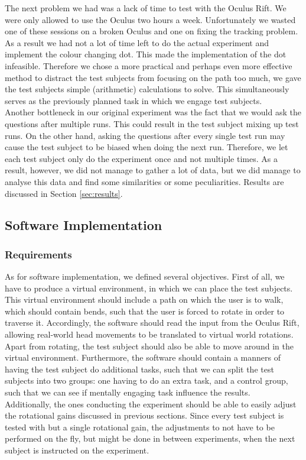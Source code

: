 The next problem we had was a lack of time to test with the Oculus Rift. 
We were only allowed to use the Oculus two hours a week. 
Unfortunately we wasted one of these sessions on a broken Oculus and one on fixing the tracking problem. 
As a result we had not a lot of time left to do the actual experiment and implement the colour changing dot. 
This made the implementation of the dot infeasible. 
Therefore we chose a more practical and perhaps even more effective method to distract the test subjects from focusing on the path too much, we gave the test subjects simple (arithmetic) calculations to solve.
This simultaneously serves as the previously planned task in which we engage test subjects.\\

Another bottleneck in our original experiment was the fact that we would ask the questions after multiple runs.
This could result in the test subject mixing up test runs. 
On the other hand, asking the questions after every single test run may cause the test subject to be biased when doing the next run.
Therefore, we let each test subject only do the experiment once and not multiple times.
As a result, however, we did not manage to gather a lot of data, but we did manage to analyse this data and find some similarities or some peculiarities.
Results are discussed in Section \ref{sec:results}.

\subsection{Software Implementation}
\subsubsection{Requirements}
As for software implementation, we defined several objectives.
First of all, we have to produce a virtual environment, in which we can place the test subjects.
This virtual environment should include a path on which the user is to walk, which should contain bends, such that the user is forced to rotate in order to traverse it.
Accordingly, the software should read the input from the Oculus Rift, allowing real-world head movements to be translated to virtual world rotations.
Apart from rotating, the test subject should also be able to move around in the virtual environment.
Furthermore, the software should contain a manners of having the test subject do additional tasks, such that we can split the test subjects into two groups: one having to do an extra task, and a control group, such that we can see if mentally engaging task influence the results.\\
Additionally, the ones conducting the experiment should be able to easily adjust the rotational gains discussed in previous sections.
Since every test subject is tested with but a single rotational gain, the adjustments to not have to be performed on the fly, but might be done in between experiments, when the next subject is instructed on the experiment.

